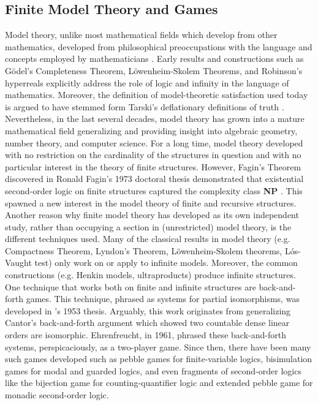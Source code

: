 \subsection{Finite Model Theory and Games}
Model theory, unlike most mathematical fields which develop from other mathematics, developed from philosophical preoccupations with the language and concepts employed by mathematicians \cite{Mancosu2010}. Early results and constructions such as G{\"o}del's Completeness Theorem, L{\"o}wenheim-Skolem Theorems, and Robinson's hyperreals explicitly address the role of logic and infinity in the language of mathematics. Moreover, the definition of model-theoretic satisfaction used today is argued to have stemmed form Tarski's deflationary definitions of truth \cite{Mancosu2010}. Nevertheless, in the last several decades, model theory has grown into a mature mathematical field generalizing and providing insight into algebraic geometry,  number theory, and computer science. For a long time, model theory developed with no restriction on the cardinality of the structures in question and with no particular interest in the theory of finite structures. However, Fagin's Theorem discovered in Ronald Fagin's 1973 doctoral thesis demonstrated that existential second-order logic on finite structures captured the complexity class \textbf{NP} \cite{Fagin1974}. This spawned a new interest in the model theory of finite and recursive structures.  Another reason why finite model theory has developed as its own independent study, rather than occupying a section in (unrestricted) model theory, is the different techniques used. Many of the classical results in model theory (e.g. Compactness Theorem, Lyndon's Theorem, L{\"o}wenheim-Skolem theorems, L{\'o}s-Vaught test) only work on or apply to infinite models. Moreover, the common constructions (e.g. Henkin models, ultraproducts) produce infinite structures. One technique that works both on finite and infinite structures are back-and-forth games. This technique, phrased as systems for partial isomorphisms, was developed in {\Fraisse}'s 1953 thesis. Arguably, this work originates from generalizing Cantor's back-and-forth argument which showed two countable dense linear orders are isomorphic. Ehrenfreucht, in 1961, phrased these back-and-forth systems, perspicaciously, as a two-player game. Since then, there have been many such games developed such as pebble games \cite{Immerman1982} for finite-variable logics, bisimulation games \cite{Gradel2014} for modal and guarded logics, and even fragments of second-order logics like the bijection game \cite{Hella1996} for counting-quantifier logic and extended pebble game \cite{Libkin2004} for monadic second-order logic.
